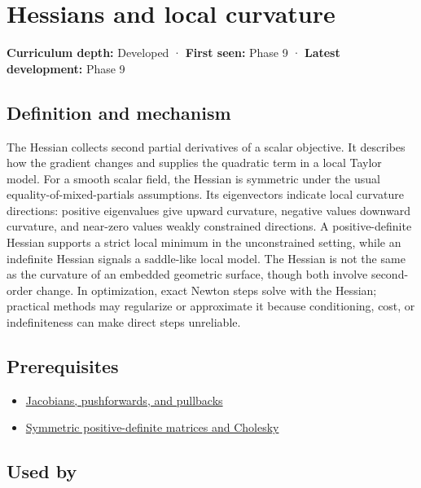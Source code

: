 \hypertarget{appendix-6ac071f8b50c}{}\label{referencestart:appendix-6ac071f8b50c}
\section{Hessians and local curvature}\label{appendix-6ac071f8b50c-hessians-and-local-curvature}

\textbf{Curriculum depth:} Developed · \textbf{First seen:} Phase 9 · \textbf{Latest development:} Phase 9

\subsection{Definition and mechanism}\label{appendix-6ac071f8b50c-definition-and-mechanism}

The Hessian collects second partial derivatives of a scalar objective. It describes how the gradient changes and supplies the quadratic term in a local Taylor model. For a smooth scalar field, the Hessian is symmetric under the usual equality-of-mixed-partials assumptions. Its eigenvectors indicate local curvature directions: positive eigenvalues give upward curvature, negative values downward curvature, and near-zero values weakly constrained directions. A positive-definite Hessian supports a strict local minimum in the unconstrained setting, while an indefinite Hessian signals a saddle-like local model. The Hessian is not the same as the curvature of an embedded geometric surface, though both involve second-order change. In optimization, exact Newton steps solve with the Hessian; practical methods may regularize or approximate it because conditioning, cost, or indefiniteness can make direct steps unreliable.

\subsection{Prerequisites}\label{appendix-6ac071f8b50c-prerequisites}

\begin{itemize}
\tightlist
\item
  \hyperref[appendix-d8a7ddb675eb]{Jacobians, pushforwards, and pullbacks}
\item
  \hyperref[appendix-50d2ea3c9b26]{Symmetric positive-definite matrices and Cholesky}
\end{itemize}

\subsection{Used by}\label{appendix-6ac071f8b50c-used-by}

